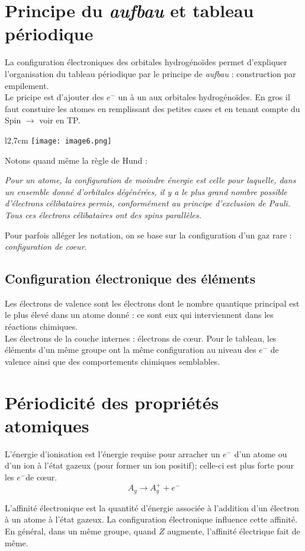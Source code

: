 \documentclass[british,french,11pt, a4paper, openany]{book}
\begin{document}
\section{Principe du \textit{aufbau} et tableau périodique}
La configuration électroniques des orbitales hydrogénoïdes permet d'expliquer l'organisation du tableau périodique par le principe de \textit{aufbau} : construction par empilement.\\
Le pricipe est d'ajouter des $e^-$ un à un aux orbitales hydrogénoïdes. En gros il faut constuire les atomes en remplissant des petites cases et en tenant compte du Spin $\rightarrow$ voir en TP.\\
\begin{wrapfigure}[6]{l}{2,7cm}
	\texttt{[image: image6.png]}
\end{wrapfigure}
Notons quand même la règle de Hund : 

\textit{Pour un atome, la configuration de moindre énergie est celle pour laquelle, dans un ensemble donné d'orbitales dégénérées, il y a le plus grand nombre possible d'électrons célibataires permis, conformément au principe d'exclusion de Pauli. Tous ces électrons célibataires ont des spins parallèles.}

Pour parfois alléger les notation, on se base sur la configuration d'un gaz rare : \textit{configuration de coeur}.

\subsection{Configuration électronique des éléments}
Les électrons de valence sont les électrons dont le nombre quantique principal est le plus élevé dans un atome donné : ce sont eux qui interviennent dans les réactions chimiques.\\
Les électrons de la couche internes : électrons de cœur. Pour le tableau, les éléments d'un même groupe ont la même configuration au niveau des $e^-$ de valence ainsi que des comportements chimiques semblables.

\section{Périodicité des propriétés atomiques}
L'énergie d'ionisation est l'énergie requise pour arracher un $e^-$ d'un atome ou d'un ion à l'état gazeux  (pour former un ion positif); celle-ci est plus forte pour les $e^-$de cœur.
$$A_g \rightarrow A_g^+ + e^-$$

L'affinité électronique est la quantité d'énergie associée à l'addition d'un électron à un atome à l'état gazeux. La configuration électronique influence cette affinité.\\
En général, dans un même groupe, quand $Z$ augmente, l'affinité électrique fait de même.\\
\end{document}
